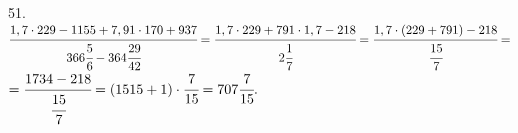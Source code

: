 51. $\cfrac{1,7\cdot229-1155+7,91\cdot170+937}{366\cfrac{5}{6}-364\cfrac{29}{42}}=
\cfrac{1,7\cdot229+791\cdot1,7-218}{2\cfrac{1}{7}}=\cfrac{1,7\cdot(229+791)-218}{\cfrac{15}{7}}=$\\$=\cfrac{1734-218}{\cfrac{15}{7}}=
(1515+1)\cdot\cfrac{7}{15}=707\cfrac{7}{15}.$\\
